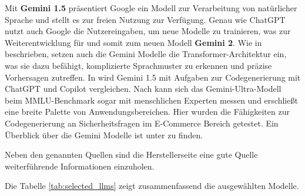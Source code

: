 
Mit \textbf{Gemini 1.5} präsentiert Google ein Modell zur Verarbeitung von natürlicher Sprache und stellt es zur freien Nutzung zur Verfügung. Genau wie ChatGPT nutzt auch Google die Nutzereingaben, um neue Modelle zu trainieren, was zur Weiterentwicklung für und somit zum neuen Modell \textbf{Gemini 2}. Wie in \cite{siam-2024} beschrieben, setzen auch die Gemini Modelle die Transformer-Architektur ein, was sie dazu befähigt, komplizierte Sprachmuster zu erkennen und präzise Vorhersagen zutreffen. In \cite{siam-2024} wird Gemini 1.5 mit Aufgaben zur Codegenerierung mit ChatGPT und Copilot vergleichen. Nach \cite{elgedawy-2024} kann sich das Gemini-Ultra-Modell beim MMLU-Benchmark sogar mit menschlichen Experten messen und erschließt eine breite Palette von Anwendungsbereichen. Hier wurden die Fähigkeiten zur Codegenerierung an Sicherheitsfragen im E-Commerce Bereich getestet. Ein Überblick über die Gemini Modelle ist unter \cite{google_gemini_model_overview} zu finden.\vspace{0.2cm}

Neben den genannten Quellen sind die Herstellerseite eine gute Quelle weiterführende Informationen einzuholen.\vspace{0.2cm}

Die Tabelle \ref{tab:selected_llms} zeigt zusammenfassend die ausgewählten Modelle.\vspace{0.2cm}

